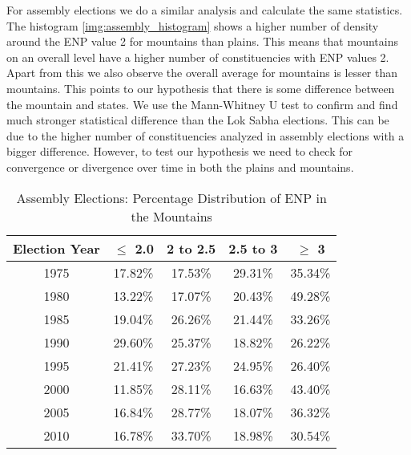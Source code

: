 For assembly elections we do a similar analysis and calculate the same statistics. The histogram \ref{img:assembly_histogram} shows a higher number of density around the ENP value 2 for mountains than plains. This means that mountains on an overall level have a higher number of constituencies with ENP values 2. Apart from this we also observe the overall average for mountains is lesser than mountains. This points to our hypothesis that there is some difference between the mountain and states. We use the Mann-Whitney U test to confirm and find much stronger statistical difference than the Lok Sabha elections. This can be due to the higher number of constituencies analyzed in assembly elections with a bigger difference. However, to test our hypothesis we need to check for convergence or divergence over time in both the plains and mountains. 

\begin{table}[h]
    \centering
    \begin{tabular}{|c|c|c|c|c|}
    \hline
    Election Year & $\leq$ 2.0 & 2 to 2.5 & 2.5 to 3 & $\geq$ 3 \\ \hline
    1975 & 17.82\% & 17.53\% & 29.31\% & 35.34\% \\ \hline
    1980 & 13.22\% & 17.07\% & 20.43\% & 49.28\% \\ \hline
    1985 & 19.04\% & 26.26\% & 21.44\% & 33.26\% \\ \hline
    1990 & 29.60\% & 25.37\% & 18.82\% & 26.22\% \\ \hline
    1995 & 21.41\% & 27.23\% & 24.95\% & 26.40\% \\ \hline
    2000 & 11.85\% & 28.11\% & 16.63\% & 43.40\% \\ \hline
    2005 & 16.84\% & 28.77\% & 18.07\% & 36.32\% \\ \hline
    2010 & 16.78\% & 33.70\% & 18.98\% & 30.54\% \\ \hline
    \end{tabular}
    \caption{Assembly Elections: Percentage Distribution of ENP in the Mountains}
    \label{tab:assembly_mountain_percentage_district}
    \end{table}


